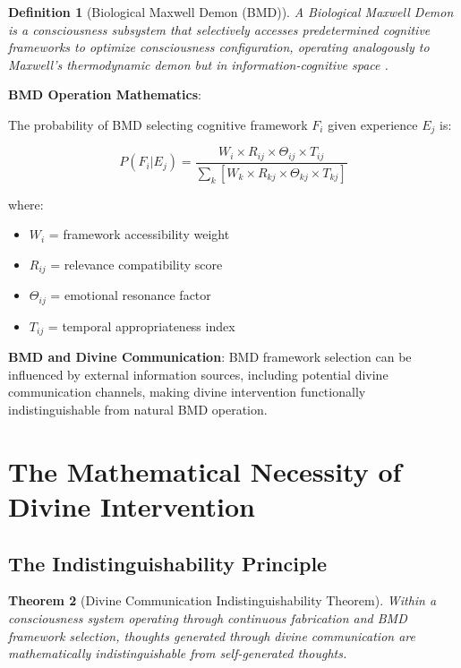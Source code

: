\documentclass[12pt,a4paper]{article}
\newtheorem{theorem}{Theorem}[section]
\newtheorem{definition}[theorem]{Definition}
\begin{document}
\begin{definition}[Biological Maxwell Demon (BMD)]
A Biological Maxwell Demon is a consciousness subsystem that selectively accesses predetermined cognitive frameworks to optimize consciousness configuration, operating analogously to Maxwell's thermodynamic demon but in information-cognitive space \citep{sachikonye2024bmd}.
\end{definition}

\textbf{BMD Operation Mathematics}:

The probability of BMD selecting cognitive framework $F_i$ given experience $E_j$ is:

$$P(F_i|E_j) = \frac{W_i \times R_{ij} \times \Theta_{ij} \times T_{ij}}{\sum_k[W_k \times R_{kj} \times \Theta_{kj} \times T_{kj}]}$$

where:
\begin{itemize}
\item $W_i$ = framework accessibility weight
\item $R_{ij}$ = relevance compatibility score  
\item $\Theta_{ij}$ = emotional resonance factor
\item $T_{ij}$ = temporal appropriateness index
\end{itemize}

\textbf{BMD and Divine Communication}: BMD framework selection can be influenced by external information sources, including potential divine communication channels, making divine intervention functionally indistinguishable from natural BMD operation.

\section{The Mathematical Necessity of Divine Intervention}

\subsection{The Indistinguishability Principle}

\begin{theorem}[Divine Communication Indistinguishability Theorem]
Within a consciousness system operating through continuous fabrication and BMD framework selection, thoughts generated through divine communication are mathematically indistinguishable from self-generated thoughts.
\end{theorem}
\end{document}
